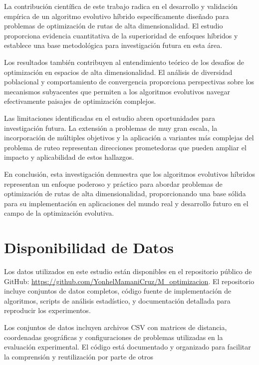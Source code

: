 \documentclass[10pt,a4paper]{article}
\begin{document}
La contribución científica de este trabajo radica en el desarrollo y validación empírica de un algoritmo evolutivo híbrido específicamente diseñado para problemas de optimización de rutas de alta dimensionalidad. El estudio proporciona evidencia cuantitativa de la superioridad de enfoques híbridos y establece una base metodológica para investigación futura en esta área.

Los resultados también contribuyen al entendimiento teórico de los desafíos de optimización en espacios de alta dimensionalidad. El análisis de diversidad poblacional y comportamiento de convergencia proporciona perspectivas sobre los mecanismos subyacentes que permiten a los algoritmos evolutivos navegar efectivamente paisajes de optimización complejos.

Las limitaciones identificadas en el estudio abren oportunidades para investigación futura. La extensión a problemas de muy gran escala, la incorporación de múltiples objetivos y la aplicación a variantes más complejas del problema de ruteo representan direcciones prometedoras que pueden ampliar el impacto y aplicabilidad de estos hallazgos.

En conclusión, esta investigación demuestra que los algoritmos evolutivos híbridos representan un enfoque poderoso y práctico para abordar problemas de optimización de rutas de alta dimensionalidad, proporcionando una base sólida para su implementación en aplicaciones del mundo real y desarrollo futuro en el campo de la optimización evolutiva.



\section{Disponibilidad de Datos}

Los datos utilizados en este estudio están disponibles en el repositorio público de GitHub: \url{https://github.com/YonhelMamaniCruz/M_optimizacion}. El repositorio incluye conjuntos de datos completos, código fuente de implementación de algoritmos, scripts de análisis estadístico, y documentación detallada para reproducir los experimentos.

Los conjuntos de datos incluyen archivos CSV con matrices de distancia, coordenadas geográficas y configuraciones de problemas utilizadas en la evaluación experimental. El código está documentado y organizado para facilitar la comprensión y reutilización por parte de otros
\end{document}
